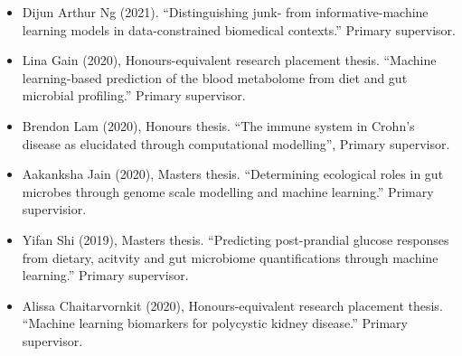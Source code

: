 \documentclass[a4paper]{article}
\begin{document}
\begin{itemize}
    \item Dijun Arthur Ng (2021). ``Distinguishing junk- from informative-machine learning models in data-constrained biomedical contexts.'' Primary supervisor.
\end{itemize}

\begin{itemize}
    \item Lina Gain (2020), Honours-equivalent research placement thesis. ``Machine learning-based prediction of the blood metabolome from diet and gut microbial profiling.'' Primary supervisor.


    \item Brendon Lam (2020), Honours thesis. ``The immune system in Crohn's disease as elucidated through computational modelling'', Primary supervisor.


    \item Aakanksha Jain (2020), Masters thesis. ``Determining ecological roles in gut microbes through genome scale modelling and machine learning.'' Primary supervisior.


    \item Yifan Shi (2019), Masters thesis. ``Predicting post-prandial glucose responses from dietary, acitvity and gut microbiome quantifications through machine learning.'' Primary supervisor.

    \item Alissa Chaitarvornkit (2020), Honours-equivalent research placement thesis. ``Machine learning biomarkers for polycystic kidney disease.'' Primary supervisor.



\end{itemize}
\end{document}
